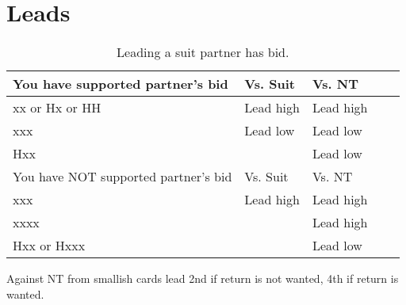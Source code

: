 \section{Leads} \label{sec:}


\begin{table}[h]
  \centering
  \begin{tabular}{l|l|l|l|l}
    You have supported partner's bid     & Vs. Suit  & Vs. NT    \\
    \hline
    xx or Hx or HH                       & Lead high & Lead high \\
    xxx                                  & Lead low  & Lead low  \\
    Hxx                                  &           & Lead low  \\
    \hline
    You have NOT supported partner's bid & Vs. Suit  & Vs. NT    \\
    \hline
    xxx                                  & Lead high & Lead high \\
    xxxx                                 &           & Lead high \\
    Hxx or Hxxx                          &           & Lead low  \\
  \end{tabular}
  \caption{Leading a suit partner has bid.}
\end{table}

Against NT from smallish cards lead 2nd if return is not wanted, 4th if return is wanted.

